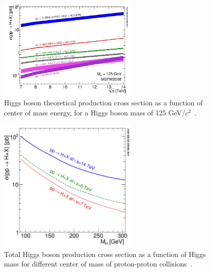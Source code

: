 \begin{figure}[!Hhtbp]
  \begin{center}
    \includegraphics[width=0.6\textwidth]{figs/7-14_Higgs_xsec.jpg}
    \caption{Higgs boson theoretical production cross section as a function of center of mass energy, for a Higgs boson mass of 125 GeV/$c^{2}$~\cite{HIGGSXSWG}.}
    \label{fig:HiggsProdXS}
  \end{center}
\end{figure}

\begin{figure}[!Hhtbp]
  \begin{center}
    \includegraphics[width=0.6\textwidth]{figs/totalXS_LM.png}
    \caption{Total Higgs boson production cross section as a function of Higgs mass for different center of mass of proton-proton collisions~\cite{Dittmaier:2011ti, Dittmaier:2012vm, Heinemeyer:2013tqa, HIGGSXSWG}.}
    \label{fig:TotalHiggsXS}
  \end{center}
\end{figure}


